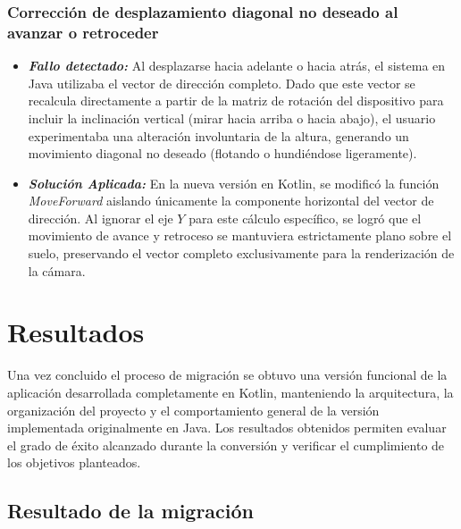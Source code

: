 \documentclass[conference]{IEEEtran}
\begin{document}
\subsubsection{Corrección de desplazamiento diagonal no deseado al avanzar o retroceder}

\begin{itemize}
	
	\vspace{0.5cm}
	
	\item \textbf{\textit{Fallo detectado:}} Al desplazarse hacia adelante o hacia atrás, el sistema en Java utilizaba el vector de dirección completo. Dado que este vector se recalcula directamente a partir de la matriz de rotación del dispositivo para incluir la inclinación vertical (mirar hacia arriba o hacia abajo), el usuario experimentaba una alteración involuntaria de la altura, generando un movimiento diagonal no deseado (flotando o hundiéndose ligeramente).\\
	
	\item \textbf{\textit{Solución Aplicada:}}  En la nueva versión en Kotlin, se modificó la función \textit{MoveForward} aislando únicamente la componente horizontal del vector de dirección. Al ignorar el eje $Y$ para este cálculo específico, se logró que el movimiento de avance y retroceso se mantuviera estrictamente plano sobre el suelo, preservando el vector completo exclusivamente para la renderización de la cámara. \\
	
\end{itemize}

\section{Resultados}

Una vez concluido el proceso de migración se obtuvo una versión funcional de la aplicación desarrollada completamente en Kotlin, manteniendo la arquitectura, la organización del proyecto y el comportamiento general de la versión implementada originalmente en Java. Los resultados obtenidos permiten evaluar el grado de éxito alcanzado durante la conversión y verificar el cumplimiento de los objetivos planteados.\\

\subsection{Resultado de la migración}
\end{document}
